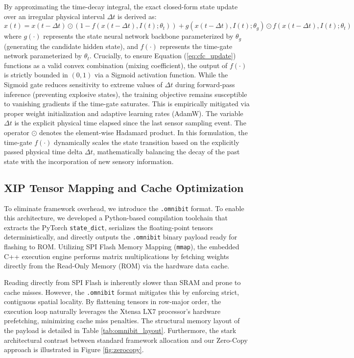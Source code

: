 \documentclass[conference]{IEEEtran}
\begin{document}
By approximating the time-decay integral, the exact closed-form state update over an irregular physical interval $\Delta t$ is derived as:
\begin{equation}
x(t) = x(t-\Delta t) \odot \left(1 - f(x(t-\Delta t), I(t); \theta_t)\right) + g(x(t-\Delta t), I(t); \theta_g) \odot f(x(t-\Delta t), I(t); \theta_t)
\label{eq:cfc_update}
\end{equation}
where $g(\cdot)$ represents the state neural network backbone parameterized by $\theta_g$ (generating the candidate hidden state), and $f(\cdot)$ represents the time-gate network parameterized by $\theta_t$. Crucially, to ensure Equation (\ref{eq:cfc_update}) functions as a valid convex combination (mixing coefficient), the output of $f(\cdot)$ is strictly bounded in $(0, 1)$ via a Sigmoid activation function. While the Sigmoid gate reduces sensitivity to extreme values of $\Delta t$ during forward-pass inference (preventing explosive states), the training objective remains susceptible to vanishing gradients if the time-gate saturates. This is empirically mitigated via proper weight initialization and adaptive learning rates (AdamW). The variable $\Delta t$ is the explicit physical time elapsed since the last sensor sampling event. The operator $\odot$ denotes the element-wise Hadamard product. In this formulation, the time-gate $f(\cdot)$ dynamically scales the state transition based on the explicitly passed physical time delta $\Delta t$, mathematically balancing the decay of the past state with the incorporation of new sensory information.

\subsection{XIP Tensor Mapping and Cache Optimization}
To eliminate framework overhead, we introduce the \texttt{.omnibit} format. To enable this architecture, we developed a Python-based compilation toolchain that extracts the PyTorch \texttt{state\_dict}, serializes the floating-point tensors deterministically, and directly outputs the \texttt{.omnibit} binary payload ready for flashing to ROM. Utilizing SPI Flash Memory Mapping (\texttt{mmap}), the embedded C++ execution engine performs matrix multiplications by fetching weights directly from the Read-Only Memory (ROM) via the hardware data cache.

Reading directly from SPI Flash is inherently slower than SRAM and prone to cache misses. However, the \texttt{.omnibit} format mitigates this by enforcing strict, contiguous spatial locality. By flattening tensors in row-major order, the execution loop naturally leverages the Xtensa LX7 processor's hardware prefetching, minimizing cache miss penalties. The structural memory layout of the payload is detailed in Table \ref{tab:omnibit_layout}. Furthermore, the stark architectural contrast between standard framework allocation and our Zero-Copy approach is illustrated in Figure \ref{fig:zerocopy}.
\end{document}
